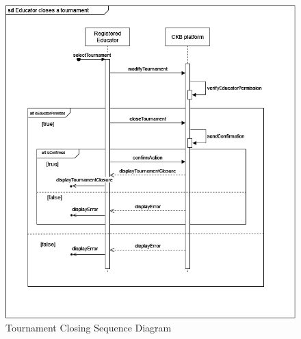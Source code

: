 \begin{center}
    \begin{figure} [H]
        \begin{center}
            \includegraphics[width=0.9\linewidth]{Images/SequenceDiagrams/SD_11.png}
            \caption{Tournament Closing Sequence Diagram}
            \label{fig: tournament_closing_seq_diag}
        \end{center}
    \end{figure}
\end{center}



